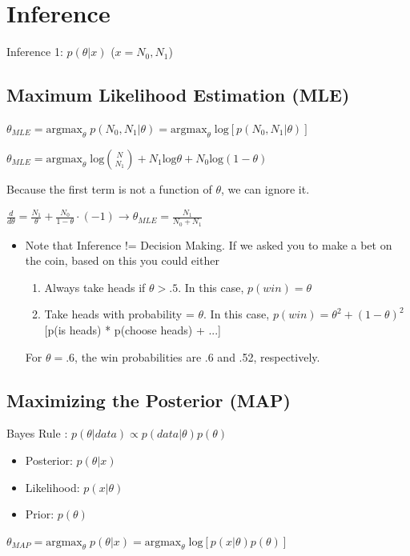 \documentclass[twoside]{article}
\begin{document}
\section{Inference}
Inference 1: $p(\theta|x)$ ($x = N_0, N_1$)

\subsection{Maximum Likelihood Estimation (MLE)}
$\theta_{MLE} = \textrm{argmax}_{\theta} \; p(N_0,N_1 | \theta) = \textrm{argmax}_{\theta}  \;\textrm{log}\left[p(N_0,N_1 | \theta)\right]$

$\theta_{MLE} = \textrm{argmax}_{\theta} \;\textrm{log}{N \choose N_1} + N_1 \textrm{log} \theta + N_0  \textrm{log} (1-\theta)$

Because the first term is not a function of $\theta$, we can ignore it.

$\frac{d}{d\theta} = \frac{N_1}{\theta} + \frac{N_0}{1-\theta} \cdot ( -1)  \rightarrow \theta_{MLE} = \frac{N_1}{N_0 + N_1}$

\begin{itemize}
\item Note that Inference != Decision Making. If we asked you to make a bet on the coin, based on this you could either
\begin{enumerate}
\item Always take heads if $\theta > .5$. In this case, $p(win) = \theta$
\item Take heads with probability = $\theta$. In this case, $p(win) = \theta^2 + (1-\theta)^2$ [p(is heads) * p(choose heads) + ...]
\end{enumerate}
For $\theta = .6$, the win probabilities are .6 and .52, respectively. 
\end{itemize}

\subsection{Maximizing the Posterior (MAP)}
Bayes Rule : $p(\theta|data) \propto p(data|\theta) p(\theta)$
\begin{itemize}
\item Posterior: $p(\theta | x)$
\item Likelihood: $p(x | \theta)$
\item Prior: $p(\theta)$
\end{itemize}
$\theta_{MAP} = \textrm{argmax}_{\theta} \; p(\theta | x) = \textrm{argmax}_{\theta}  \;\textrm{log}\left[p(x | \theta) p(\theta)\right]$\\
\end{document}
